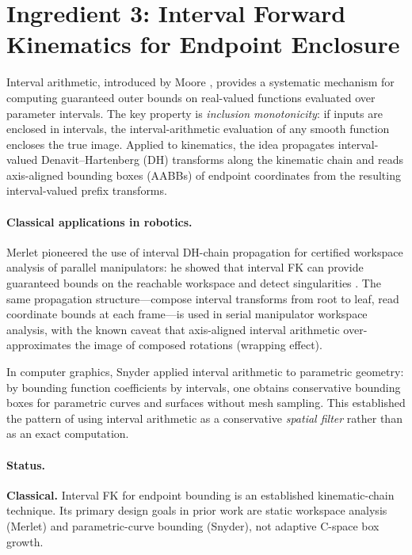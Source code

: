 \documentclass[11pt,a4paper]{article}
\begin{document}
\section{Ingredient 3: Interval Forward Kinematics for Endpoint Enclosure}
\label{sec:interval_kin}

Interval arithmetic, introduced by Moore \cite{moore1966interval}, provides a
systematic mechanism for computing guaranteed outer bounds on real-valued
functions evaluated over parameter intervals.  The key property is
\emph{inclusion monotonicity}: if inputs are enclosed in intervals, the
interval-arithmetic evaluation of any smooth function encloses the true image.
Applied to kinematics, the idea propagates interval-valued Denavit--Hartenberg
(DH) transforms along the kinematic chain and reads axis-aligned bounding boxes
(AABBs) of endpoint coordinates from the resulting interval-valued prefix
transforms.

\paragraph{Classical applications in robotics.}
Merlet pioneered the use of interval DH-chain propagation for certified
workspace analysis of parallel manipulators: he showed that interval FK can
provide guaranteed bounds on the reachable workspace and detect
singularities \cite{merlet2004solving,merlet2009interval}.  The same
propagation structure---compose interval transforms from root to leaf, read
coordinate bounds at each frame---is used in serial manipulator workspace
analysis, with the known caveat that axis-aligned interval arithmetic over-
approximates the image of composed rotations (wrapping effect).

In computer graphics, Snyder \cite{snyder1992interval} applied interval
arithmetic to parametric geometry: by bounding function coefficients by
intervals, one obtains conservative bounding boxes for parametric curves and
surfaces without mesh sampling.  This established the pattern of using interval
arithmetic as a conservative \emph{spatial filter} rather than as an exact
computation.

\paragraph{Status.}
\textbf{Classical.}  Interval FK for endpoint bounding is an established
kinematic-chain technique.  Its primary design goals in prior work are static
workspace analysis (Merlet) and parametric-curve bounding (Snyder), not
adaptive C-space box growth.
\end{document}
